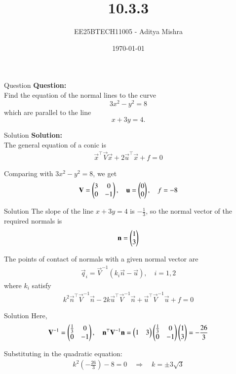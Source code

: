 \documentclass{beamer}
\title{10.3.3}
\date{\today}
\author{EE25BTECH11005 - Aditya Mishra}
\begin{document}
\frame{\titlepage}

\begin{frame}{Question}
\textbf{Question:}\\
Find the equation of the normal lines to the curve
\[
3x^2 - y^2 = 8
\]
which are parallel to the line
\[
x + 3y = 4.
\]
\end{frame}

\begin{frame}{Solution}
\textbf{Solution:}\\

The general equation of a conic is 
\begin{align}
\vec{x}^\top \vec{V} \vec{x} + 2\vec{u}^\top \vec{x} + f = 0
\end{align}

Comparing with $3x^2 - y^2 = 8$, we get
\begin{align}
\mathbf{V} = \begin{pmatrix}3 & 0 \\ 0 & -1\end{pmatrix},\quad
\mathbf{u} = \begin{pmatrix}0 \\ 0\end{pmatrix},\quad
f = -8
\end{align}
\end{frame}

\begin{frame}{Solution}
The slope of the line $x + 3y = 4$ is $-\frac{1}{3}$, so the normal vector of the required normals is
\begin{align}
\mathbf{n} = \begin{pmatrix}1 \\ 3\end{pmatrix}
\end{align}

The points of contact of normals with a given normal vector are
\begin{align}
\vec{q}_i = \vec{V}^{-1} (k_i \vec{n} - \vec{u}), \quad i = 1,2
\end{align}
where $k_i$ satisfy
\begin{align}
k^2 \vec{n}^\top \vec{V}^{-1} \vec{n} - 2 k \vec{u}^\top \vec{V}^{-1} \vec{n} + \vec{u}^\top \vec{V}^{-1} \vec{u} + f = 0
\end{align}
\end{frame}

\begin{frame}{Solution}
Here,
\begin{align}
\mathbf{V}^{-1} = \begin{pmatrix}\tfrac{1}{3} & 0 \\ 0 & -1\end{pmatrix}, \quad
\mathbf{n}^\top \mathbf{V}^{-1} \mathbf{n} = \begin{pmatrix}1 & 3\end{pmatrix} \begin{pmatrix}\tfrac{1}{3} & 0 \\ 0 & -1\end{pmatrix} \begin{pmatrix}1 \\ 3\end{pmatrix} = -\frac{26}{3}
\end{align}

Substituting in the quadratic equation:
\begin{align}
k^2 \left(-\frac{26}{3}\right) - 8 = 0
\quad \Rightarrow \quad k = \pm 3\sqrt{3}
\end{align}
\end{frame}
\end{document}
